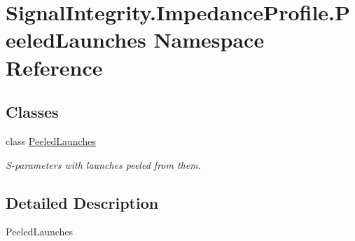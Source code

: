 \hypertarget{namespaceSignalIntegrity_1_1ImpedanceProfile_1_1PeeledLaunches}{}\section{Signal\+Integrity.\+Impedance\+Profile.\+Peeled\+Launches Namespace Reference}
\label{namespaceSignalIntegrity_1_1ImpedanceProfile_1_1PeeledLaunches}
\subsection*{Classes}
\begin{DoxyCompactItemize}
\item 
class \hyperlink{classSignalIntegrity_1_1ImpedanceProfile_1_1PeeledLaunches_1_1PeeledLaunches}{Peeled\+Launches}
\begin{DoxyCompactList}\small\item\em S-\/parameters with launches peeled from them. \end{DoxyCompactList}\end{DoxyCompactItemize}


\subsection{Detailed Description}
\begin{DoxyVerb}PeeledLaunches\end{DoxyVerb}
 